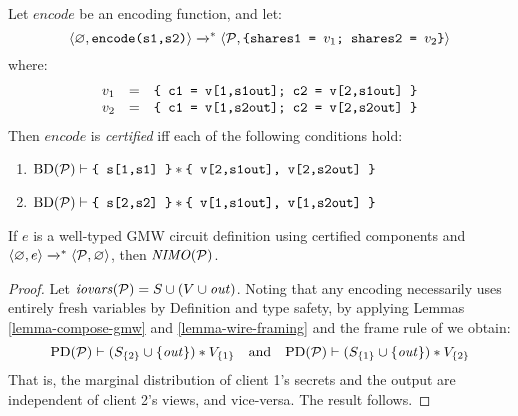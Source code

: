 \begin{definition}
  Let $\mathit{encode}$ be an encoding function, and let:
  $$
  \langle \varnothing,\texttt{encode(s1,s2)} \rangle \xrightarrow{}^{*}
  \langle \mathcal{P},\texttt{\{shares1 = }v_1\texttt{; shares2 = }v_2\texttt{\}} \rangle
  $$
  where:
  $$
  \begin{array}{rcl}
    v_1 &=& \texttt{\{ c1 = v[1,s1out]; c2 = v[2,s1out] \}}\\
    v_2 &=& \texttt{\{ c1 = v[1,s2out]; c2 = v[2,s2out] \}}
  \end{array}
  $$
  Then $\mathit{encode}$ is \emph{certified} iff each of the following conditions hold:
  \begin{enumerate}[\hspace{5mm}i.]
  \item $\mathrm{BD}(\mathcal{P}) \vdash \texttt{\{ s[1,s1] \}} * \texttt{\{ v[2,s1out], v[2,s2out] \}}$
  \item $\mathrm{BD}(\mathcal{P}) \vdash \texttt{\{ s[2,s2] \}} * \texttt{\{ v[1,s1out], v[1,s2out] \}}$
  \end{enumerate}
\end{definition}

\begin{theorem}
  \label{theorem-gmw-NIMO}
  If $e$ is a well-typed GMW circuit definition using certified
  components and $\langle \varnothing,e \rangle \xrightarrow{}^{*}
  \langle \mathcal{P},\varnothing \rangle$, then $\mathit{NIMO}(\mathcal{P})$.
\end{theorem}
\begin{proof}
  Let $\mathit{iovars}(\mathcal{P}) = S \cup (V \cup \mathit{out})$. Noting that any encoding
  necessarily uses entirely fresh variables by Definition and type
  safety, by applying Lemmas \ref{lemma-compose-gmw} and
  \ref{lemma-wire-framing} and the frame rule of
  \cite{barthe2019probabilistic} we obtain:
  $$
  \mathrm{PD}(\mathcal{P}) \vdash (S_{\{2\}}\cup\{\mathit{out}\}) * V_{\{1\}}
  \quad \text{and} \quad \mathrm{PD}(\mathcal{P}) \vdash (S_{\{1\}}\cup\{\mathit{out}\}) * V_{\{2\}}
  $$
  That is, the marginal distribution of client 1's secrets and the output are independent
  of client 2's views, and vice-versa. The result follows. 
\end{proof}

